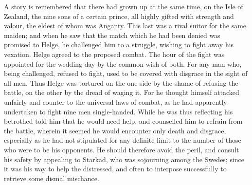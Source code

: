 \documentclass[10pt,a4paper]{report}
\begin{document}
A story is remembered that there had grown up at the same time, on the Isle of Zealand, the nine sons of a certain prince, all highly gifted with strength and valour, the eldest of whom was Anganty. This last was a rival suitor for the same maiden; and when he saw that the match which he had been denied was promised to Helge, he challenged him to a struggle, wishing to fight away his vexation. Helge agreed to the proposed combat. The hour of the fight was appointed for the wedding-day by the common wish of both. For any man who, being challenged, refused to fight, used to be covered with disgrace in the sight of all men. Thus Helge was tortured on the one side by the shame of refusing the battle, on the other by the dread of waging it. For he thought himself attacked unfairly and counter to the universal laws of combat, as he had apparently undertaken to fight nine men single-handed. While he was thus reflecting his betrothed told him that he would need help, and counselled him to refrain from the battle, wherein it seemed he would encounter only death and disgrace, especially as he had not stipulated for any definite limit to the number of those who were to be his opponents. He should therefore avoid the peril, and consult his safety by appealing to Starkad, who was sojourning among the Swedes; since it was his way to help the distressed, and often to interpose successfully to retrieve some dismal mischance.\\
\end{document}
